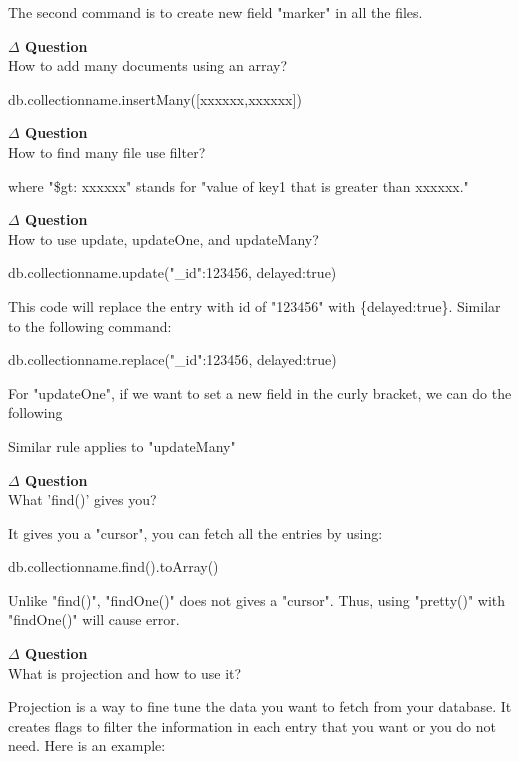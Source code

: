 \documentclass[12pt]{article}
\newenvironment{que}
    { \begin{mdframed}[backgroundcolor=green!20] \textbf{$\Delta$ Question} \\}
    {  \end{mdframed}}
\begin{document}
The second command is to create new field "marker" in all the files.
\begin{que}
How to add many documents using an array?
\end{que}
\begin{code}
db.collectionname.insertMany([{xxxxxx},{xxxxxx}])
\end{code}
\begin{que}
How to find many file use filter?
\end{que}
where "\$gt: xxxxxx" stands for "value of key1 that is greater than xxxxxx."
\begin{que}
How to use update, updateOne, and updateMany?
\end{que}
\begin{code}
db.collectionname.update({"_id":123456}, {delayed:true})
\end{code}
This code will replace the entry with id of "123456" with \{delayed:true\}. Similar to the following command:
\begin{code}
db.collectionname.replace({"_id":123456}, {delayed:true})
\end{code}
For "updateOne", if we want to set a new field in the curly bracket, we can do the following
Similar rule applies to "updateMany"
\begin{que}
What 'find()' gives you?
\end{que}
It gives you a "cursor", you can fetch all the entries by using:
\begin{code}
db.collectionname.find().toArray()
\end{code}
Unlike "find()", "findOne()" does not gives a "cursor". Thus, using "pretty()" with "findOne()" will cause error.
\begin{que}
What is projection and how to use it?
\end{que}
Projection is a way to fine tune the data you want to fetch from your database. It creates flags to filter the information in each entry that you want or you do not need. Here is an example:
\end{document}
